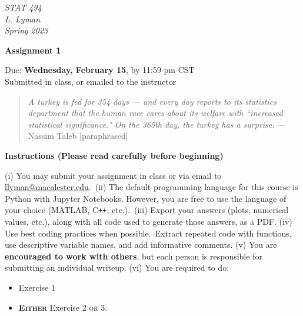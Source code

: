 \documentclass[11pt,letterpaper,twoside]{article}
\begin{document}
 \pagestyle{empty}
\begin{minipage}[t]{0.6\linewidth}
  {\small\it STAT 494\\
     L. Lyman \\
     Spring 2023}
\end{minipage}
\hfill

\smallskip

\begin{center}
\textbf{Assignment 1
{\color{blue}{-- Solution}}{}
}

\medskip
Due: \textbf{Wednesday, February 15}, by 11:59 pm CST\\
Submitted in class, or emailed to the instructor \\

\medskip


\end{center}
\medskip

\begin{quote}
\textit{A turkey is fed for 354 days — and every
day reports to its statistics department
that the human race cares about its welfare with ``increased statistical significance." On
the 365th day, the turkey has a surprise.}
--- Nassim Taleb [paraphrased] 
\end{quote}

\bigskip

\textbf{Instructions (Please read carefully before beginning)}

\smallskip
(i) You may submit your assignment in class or via email to \href{mailto:llyman@macalester.edu}{llyman@macalester.edu}.~(ii) The default programming language for this course is Python with Jupyter Notebooks. However, you are free to use the language of your choice (MATLAB, C\texttt{++}, etc.).~(iii) Export your answers (plots, numerical values, etc.), along with all code used to generate those answers, as a PDF. (iv) Use best coding practices when possible.~Extract repeated code with functions, use descriptive variable names, and add informative comments. (v) You are \textbf{encouraged to work with others}, but each person is responsible for submitting an individual writeup. (vi) You are required to do:
\begin{itemize}

\item Exercise 1
\item \textbf{\textsc{Either}} Exercise 2 \textsc{or} 3.
\end{itemize}
\end{document}
